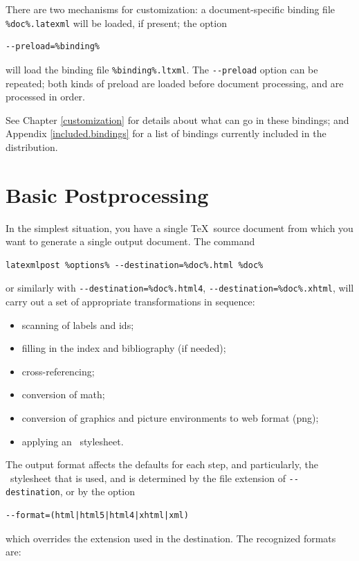 \documentclass{book}
\newcommand{\shellcode}{\lstinline[style=shell]}
\begin{document}
There are two mechanisms for customization:
a document-specific binding file \shellcode|%
be loaded, if present;
the option
\begin{lstlisting}[style=shell]
--preload=%binding%
\end{lstlisting}
will load the binding file \shellcode|%
The \shellcode|--preload| option can be repeated;
both kinds of preload are loaded before document processing,
and are processed in order.

See Chapter \ref{customization} for details about what can go in these bindings;
and Appendix \ref{included.bindings} for a list of bindings currently
included in the distribution.


\section[Postprocessing]{Basic Postprocessing}\label{usage.post}
In the simplest situation, you have a single \TeX\ source document
from which you want to generate a single output document.
The command
\begin{lstlisting}[style=shell]
latexmlpost %options% --destination=%doc%.html %doc%
\end{lstlisting}
or similarly with
\shellcode|--destination=%
\shellcode|--destination=%
will carry out a set of appropriate transformations in sequence:
\begin{itemize}
  \item scanning of labels and ids;
  \item filling in the index and bibliography (if needed);
  \item cross-referencing;
  \item conversion of math;
  \item conversion of graphics and picture environments to web format (png);
  \item applying an \XSLT\ stylesheet.
\end{itemize}
The output format affects the defaults for each step, and particularly,
the \XSLT\ stylesheet that is used, and is determined
by the file extension of \shellcode{--destination}, or by the option
\begin{lstlisting}[style=shell]
--format=(html|html5|html4|xhtml|xml)
\end{lstlisting}
which overrides the extension used in the destination. The recognized formats are:
\end{document}
